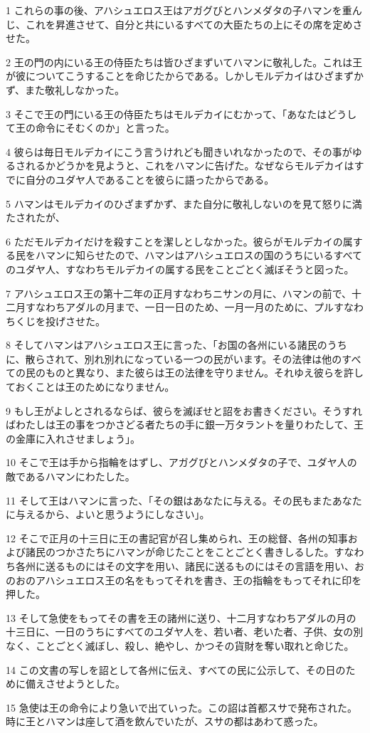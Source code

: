 \par 1 これらの事の後、アハシュエロス王はアガグびとハンメダタの子ハマンを重んじ、これを昇進させて、自分と共にいるすべての大臣たちの上にその席を定めさせた。
\par 2 王の門の内にいる王の侍臣たちは皆ひざまずいてハマンに敬礼した。これは王が彼についてこうすることを命じたからである。しかしモルデカイはひざまずかず、また敬礼しなかった。
\par 3 そこで王の門にいる王の侍臣たちはモルデカイにむかって、「あなたはどうして王の命令にそむくのか」と言った。
\par 4 彼らは毎日モルデカイにこう言うけれども聞きいれなかったので、その事がゆるされるかどうかを見ようと、これをハマンに告げた。なぜならモルデカイはすでに自分のユダヤ人であることを彼らに語ったからである。
\par 5 ハマンはモルデカイのひざまずかず、また自分に敬礼しないのを見て怒りに満たされたが、
\par 6 ただモルデカイだけを殺すことを潔しとしなかった。彼らがモルデカイの属する民をハマンに知らせたので、ハマンはアハシュエロスの国のうちにいるすべてのユダヤ人、すなわちモルデカイの属する民をことごとく滅ぼそうと図った。
\par 7 アハシュエロス王の第十二年の正月すなわちニサンの月に、ハマンの前で、十二月すなわちアダルの月まで、一日一日のため、一月一月のために、プルすなわちくじを投げさせた。
\par 8 そしてハマンはアハシュエロス王に言った、「お国の各州にいる諸民のうちに、散らされて、別れ別れになっている一つの民がいます。その法律は他のすべての民のものと異なり、また彼らは王の法律を守りません。それゆえ彼らを許しておくことは王のためになりません。
\par 9 もし王がよしとされるならば、彼らを滅ぼせと詔をお書きください。そうすればわたしは王の事をつかさどる者たちの手に銀一万タラントを量りわたして、王の金庫に入れさせましょう」。
\par 10 そこで王は手から指輪をはずし、アガグびとハンメダタの子で、ユダヤ人の敵であるハマンにわたした。
\par 11 そして王はハマンに言った、「その銀はあなたに与える。その民もまたあなたに与えるから、よいと思うようにしなさい」。
\par 12 そこで正月の十三日に王の書記官が召し集められ、王の総督、各州の知事および諸民のつかさたちにハマンが命じたことをことごとく書きしるした。すなわち各州に送るものにはその文字を用い、諸民に送るものにはその言語を用い、おのおのアハシュエロス王の名をもってそれを書き、王の指輪をもってそれに印を押した。
\par 13 そして急使をもってその書を王の諸州に送り、十二月すなわちアダルの月の十三日に、一日のうちにすべてのユダヤ人を、若い者、老いた者、子供、女の別なく、ことごとく滅ぼし、殺し、絶やし、かつその貨財を奪い取れと命じた。
\par 14 この文書の写しを詔として各州に伝え、すべての民に公示して、その日のために備えさせようとした。
\par 15 急使は王の命令により急いで出ていった。この詔は首都スサで発布された。時に王とハマンは座して酒を飲んでいたが、スサの都はあわて惑った。


